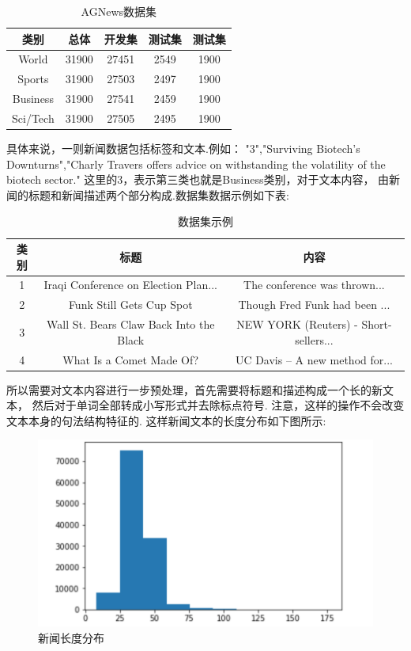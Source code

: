 \documentclass[bachelor,adobefonts]{jnuthesis}
\begin{document}
\begin{table}[h!]
  \centering
  \begin{tabular}{ccccc}
    \toprule
    \textbf{类别} & \textbf{总体} & \textbf{开发集} & \textbf{测试集} & \textbf{测试集} \\
    \midrule
    World & 31900 & 27451 & 2549 & 1900 \\
    Sports & 31900 & 27503 & 2497 & 1900 \\
    Business & 31900 & 27541 & 2459 & 1900 \\
    Sci/Tech & 31900 & 27505 & 2495 & 1900 \\
    \bottomrule
  \end{tabular}
  \caption{AGNews数据集}
\end{table}

具体来说，一则新闻数据包括标签和文本.例如：
"3","Surviving Biotech's Downturns","Charly Travers offers advice on withstanding the volatility of the biotech sector."
这里的3，表示第三类也就是Business类别，对于文本内容，
由新闻的标题和新闻描述两个部分构成.数据集数据示例如下表:

\begin{table}[h!]
  \centering
  \begin{tabular}{ccc}
    \toprule
    \textbf{类别} & \textbf{标题} & \textbf{内容}\\
    \midrule
    1 & Iraqi Conference on Election Plan...& The conference was thrown... \\
    2 & Funk Still Gets Cup Spot & Though Fred Funk had been ... \\
    3 & Wall St. Bears Claw Back Into the Black &  NEW YORK (Reuters) - Short-sellers... \\
    4 & What Is a Comet Made Of? & UC Davis -- A new method for... \\
    \bottomrule
  \end{tabular}
  \caption{数据集示例}
\end{table}


所以需要对文本内容进行一步预处理，首先需要将标题和描述构成一个长的新文本，
然后对于单词全部转成小写形式并去除标点符号.
注意，这样的操作不会改变文本本身的句法结构特征的.
这样新闻文本的长度分布如下图所示:

\begin{figure}[h!]
  \centering
  \includegraphics[width=0.6\linewidth]{长度分布.png}
  \caption{新闻长度分布}
\end{figure}
\end{document}

